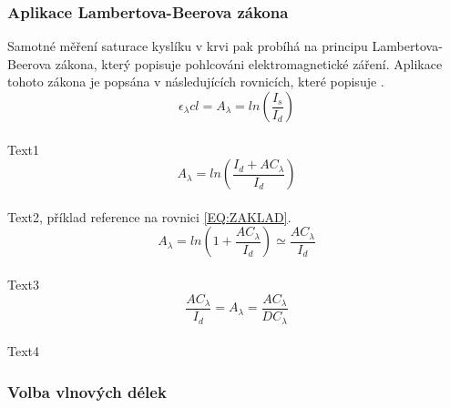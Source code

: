 \subsubsection{Aplikace Lambertova-Beerova zákona} Samotné měření saturace kyslíku v krvi pak probíhá na principu Lambertova-Beerova zákona, který popisuje pohlcováni elektromagnetické záření. Aplikace tohoto zákona je popsána v následujících rovnicích, které popisuje \cite{KYRIACOU}.
\begin{equation}%
  {\epsilon_{\lambda}cl} = A_{\lambda} = ln(\frac{I_s}{I_d})  
\end{equation}\\
Text1\\
\begin{equation}
    A_{\lambda} = ln(\frac{I_d+AC_{\lambda}}{I_d})
    \label{EQ:ZAKLAD}
\end{equation}\\
Text2, příklad reference na rovnici \ref{EQ:ZAKLAD}.\\
\begin{equation}
    A_{\lambda} = ln(1+\frac{AC_{\lambda}}{I_d}) \simeq \frac{AC_{\lambda}}{I_d}
\end{equation}\\
Text3\\
\begin{equation}
    \frac{AC_{\lambda}}{I_d} = A_{\lambda} = \frac{AC_{\lambda}}{DC_{\lambda}}
\end{equation}\\
Text4\\

\subsubsection{Volba vlnových délek}
 

